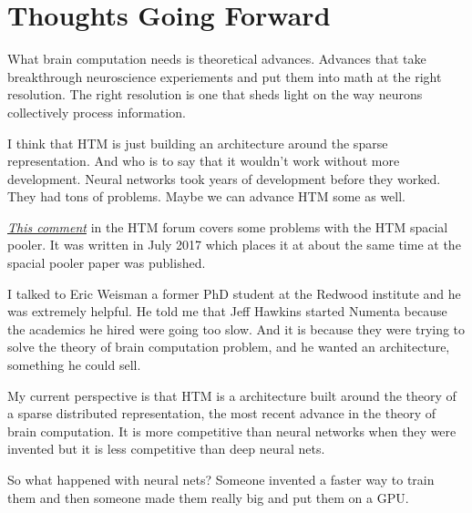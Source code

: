 \documentclass{article}
\begin{document}
\section*{Thoughts Going Forward}
What brain computation needs is theoretical advances. Advances that take breakthrough neuroscience experiements and put them into math at the right resolution. The right resolution is one that sheds light on the way neurons collectively process information.

I think that HTM is just building an architecture around the sparse representation. And who is to say that it wouldn't work without more development. Neural networks took years of development before they worked. They had tons of problems. Maybe we can advance HTM some as well.

\textit{\href{https://discourse.numenta.org/t/why-is-htm-ignored-by-google-deepmind/2589/10?u=djpasseyjr}{This comment}} in the HTM forum covers some problems with the HTM spacial pooler. It was written in July 2017 which places it at about the same time at the spacial pooler paper was published.

I talked to Eric Weisman a former PhD student at the Redwood institute and he was extremely helpful. He told me that Jeff Hawkins started Numenta because the academics he hired were going too slow. And it is because they were trying to solve the theory of brain computation problem, and he wanted an architecture, something he could sell.

My current perspective is that HTM is a architecture built around the theory of a sparse distributed representation, the most recent advance in the theory of brain computation. It is more competitive than neural networks when they were invented but it is less competitive than deep neural nets.

So what happened with neural nets? Someone invented a faster way to train them and then someone made them really big and put them on a GPU.


\end{document}
